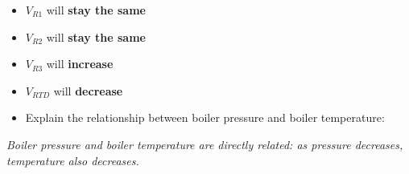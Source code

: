 





\begin{itemize}
\item{} $V_{R1}$ will {\bf stay the same}
\item{} $V_{R2}$ will {\bf stay the same}
\item{} $V_{R3}$ will {\bf increase}
\item{} $V_{RTD}$ will {\bf decrease}
\item{} Explain the relationship between boiler pressure and boiler temperature:
\end{itemize}

\vskip 10pt

{\it Boiler pressure and boiler temperature are directly related: as pressure decreases, temperature also decreases.}











